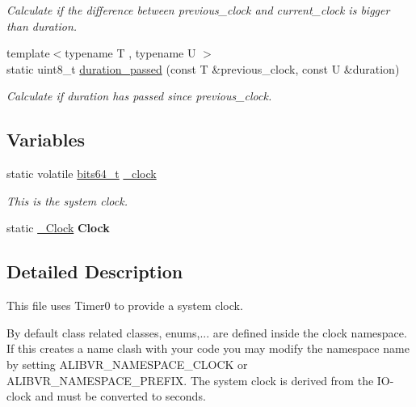 \begin{DoxyCompactItemize}
\begin{DoxyCompactList}\small\item\em Calculate if the difference between previous\+\_\+clock and current\+\_\+clock is bigger than duration. \end{DoxyCompactList}\item 
{\footnotesize template$<$typename T , typename U $>$ }\\static uint8\+\_\+t \hyperlink{namespaceclock_aafd8b2bf08806cd40128eac84ea82e8e}{duration\+\_\+passed} (const T \&previous\+\_\+clock, const U \&duration)
\begin{DoxyCompactList}\small\item\em Calculate if duration has passed since previous\+\_\+clock. \end{DoxyCompactList}\end{DoxyCompactItemize}
\subsection*{Variables}
\begin{DoxyCompactItemize}
\item 
static volatile \hyperlink{unionbits64__s}{bits64\+\_\+t} \hyperlink{namespaceclock_a0cfce972d3684eddb3dd61bb0baaf225}{\+\_\+clock}
\begin{DoxyCompactList}\small\item\em This is the system clock. \end{DoxyCompactList}\item 
static \hyperlink{classclock_1_1__Clock}{\+\_\+\+Clock} {\bfseries Clock}\hypertarget{namespaceclock_a8414359d2fd2b9f75143850c0e3bb4b5}{}\label{namespaceclock_a8414359d2fd2b9f75143850c0e3bb4b5}

\end{DoxyCompactItemize}


\subsection{Detailed Description}
This file uses {\ttfamily Timer0} to provide a system clock. 

By default class related classes, enums,... are defined inside the {\ttfamily clock} namespace. If this creates a name clash with your code you may modify the namespace name by setting A\+L\+I\+B\+V\+R\+\_\+\+N\+A\+M\+E\+S\+P\+A\+C\+E\+\_\+\+C\+L\+O\+CK or A\+L\+I\+B\+V\+R\+\_\+\+N\+A\+M\+E\+S\+P\+A\+C\+E\+\_\+\+P\+R\+E\+F\+IX. The system clock is derived from the I\+O-\/clock and must be converted to seconds.

